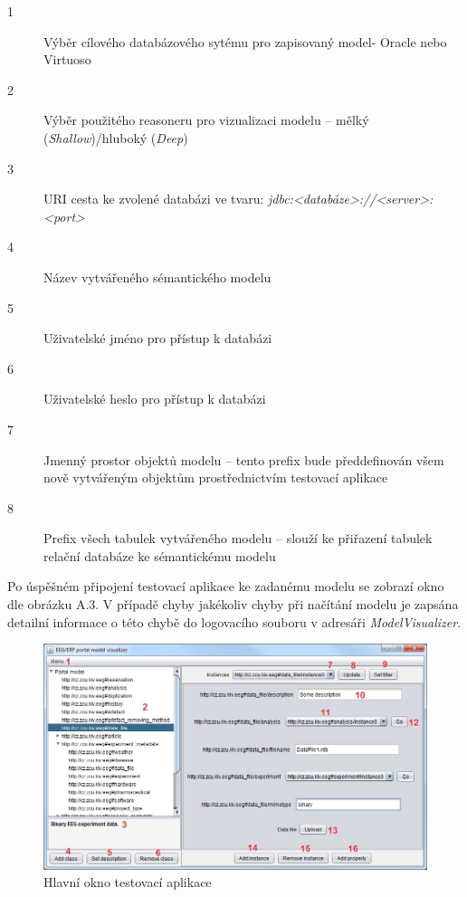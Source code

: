 \documentclass{projekt}
\begin{document}
\begin{description}
\item[1] Výběr cílového databázového sytému pro zapisovaný model- Oracle nebo Virtuoso
\item[2] Výběr použitého reasoneru pro vizualizaci modelu – mělký ({\it Shallow})/hluboký ({\it Deep})
\item[3] URI cesta ke zvolené databázi ve tvaru: {\it jdbc:<databáze>://<server>:<port>}
\item[4] Název vytvářeného sémantického modelu
\item[5] Uživatelské jméno pro přístup k databázi
\item[6] Uživatelské heslo pro přístup k databázi
\item[7] Jmenný prostor objektů modelu – tento prefix bude předdefinován všem nově vytvářeným objektům prostřednictvím testovací aplikace 
\item[8] Prefix všech tabulek vytvářeného modelu – slouží ke přiřazení tabulek relační databáze ke sémantickému modelu
\end{description}


Po úspěšném připojení testovací aplikace ke zadanému modelu se zobrazí okno dle obrázku A.3. V případě chyby jakékoliv chyby při načítání modelu je zapsána detailní informace o této chybě do logovacího souboru v adresáři {\it ModelVisualizer}. 

\begin{figure}[htb!]
\begin{center}
\includegraphics[scale=0.57]{manualTestMain.jpg}
\caption{Hlavní okno testovací aplikace}
\end{center}
\end{figure}
\end{document}
